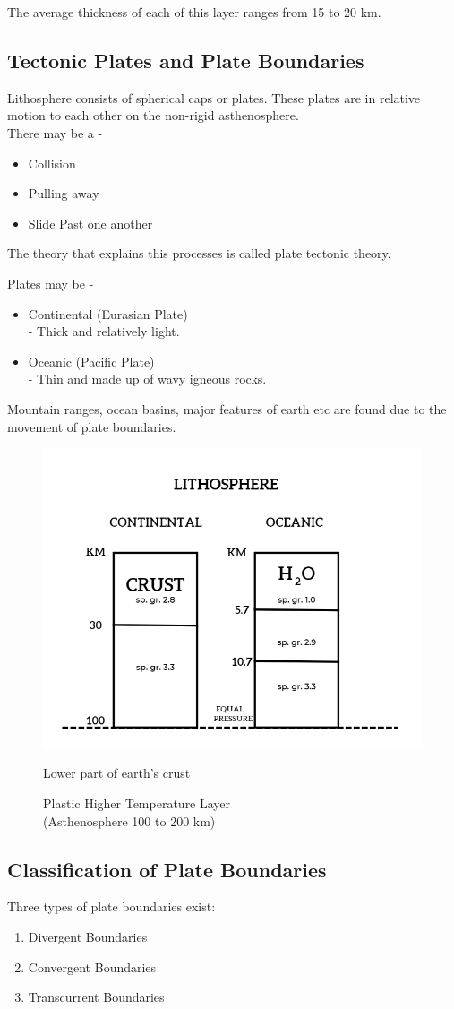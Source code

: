 \documentclass{article}
\begin{document}
\vspace*{0.5cm}
The average thickness of each of this layer ranges from 15 to 20 km. 


\subsection*{Tectonic Plates and Plate Boundaries}
Lithosphere consists of spherical caps or plates. These plates are in relative motion to each other on the non-rigid asthenosphere. \\
There may be a - 
\begin{itemize}
  \item Collision
  \item Pulling away 
  \item Slide Past one another 
\end{itemize}

The theory that explains this processes is called plate tectonic theory.

\vspace*{1cm}

Plates may be - 
\begin{itemize}
  \item Continental (Eurasian Plate) \\ - Thick and relatively light.
  \item Oceanic (Pacific Plate) \\ - Thin and made up of wavy igneous rocks.
\end{itemize}

Mountain ranges, ocean basins, major features of earth etc are found due to the movement of plate boundaries. 

\begin{figure}[h]
  \begin{center}
    \includegraphics*[width=0.7\linewidth]{img/lithospehere.png}
    \caption{Plastic Higher Temperature Layer\\ (Asthenosphere 100 to 200 km)}
    Lower part of earth's crust 
  \end{center}
\end{figure}


\subsection*{Classification of Plate Boundaries} 
Three types of plate boundaries exist:
\begin{enumerate}
  \item Divergent Boundaries 
  \item Convergent Boundaries 
  \item Transcurrent Boundaries 
\end{enumerate}
\hrulefill
\end{document}
